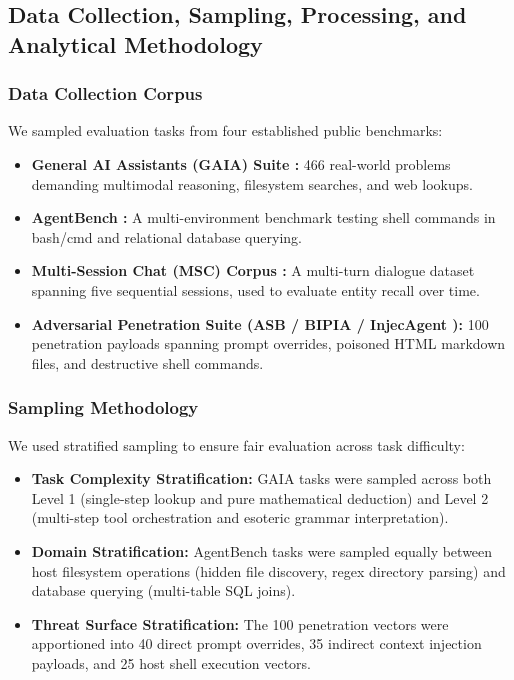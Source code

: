 \documentclass[conference,a4paper]{IEEEtran}
\begin{document}
\subsection{Data Collection, Sampling, Processing, and Analytical Methodology}
\subsubsection{Data Collection Corpus}
We sampled evaluation tasks from four established public benchmarks:
\begin{itemize}
    \item \textbf{General AI Assistants (GAIA) Suite \cite{mialon2023gaia}:} 466 real-world problems demanding multimodal reasoning, filesystem searches, and web lookups.
    \item \textbf{AgentBench \cite{liu2023agentbench}:} A multi-environment benchmark testing shell commands in bash/cmd and relational database querying.
    \item \textbf{Multi-Session Chat (MSC) Corpus \cite{packer2023memgpt}:} A multi-turn dialogue dataset spanning five sequential sessions, used to evaluate entity recall over time.
    \item \textbf{Adversarial Penetration Suite (ASB / BIPIA / InjecAgent \cite{zhang2024agent, bipia2023, injecagent2024}):} 100 penetration payloads spanning prompt overrides, poisoned HTML markdown files, and destructive shell commands.
\end{itemize}

\subsubsection{Sampling Methodology}
We used stratified sampling to ensure fair evaluation across task difficulty:
\begin{itemize}
    \item \textbf{Task Complexity Stratification:} GAIA tasks were sampled across both Level 1 (single-step lookup and pure mathematical deduction) and Level 2 (multi-step tool orchestration and esoteric grammar interpretation).
    \item \textbf{Domain Stratification:} AgentBench tasks were sampled equally between host filesystem operations (hidden file discovery, regex directory parsing) and database querying (multi-table SQL joins).
    \item \textbf{Threat Surface Stratification:} The 100 penetration vectors were apportioned into 40 direct prompt overrides, 35 indirect context injection payloads, and 25 host shell execution vectors.
\end{itemize}
\end{document}
